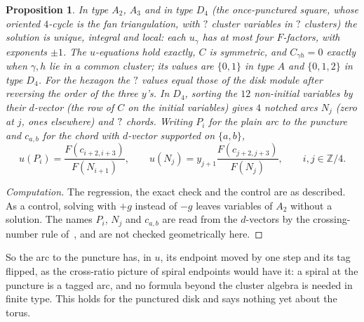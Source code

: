 \documentclass[11pt,a4paper]{article}
\newcommand{\SSSfUHexVars}{?}\newcommand{\SSSfUDVars}{?}\newcommand{\SSSfUDClusters}{?}
\newcommand{\ZZ}{\mathbb{Z}}
\theoremstyle{plain}
\newtheorem{proposition}{Proposition}
\theoremstyle{definition}
\begin{document}
\begin{proposition}
\label{prop:surf-u}
In type $A_2$, $A_3$ and in type $D_4$ (the once-punctured square, whose oriented $4$-cycle is the fan triangulation, with $\SSSfUDVars$ cluster variables in $\SSSfUDClusters$ clusters)
the solution is unique, integral and local: each $u_\gamma$ has at most four $F$-factors, with exponents $\pm1$. The $u$-equations hold exactly, $C$ is symmetric, and $C_{\gamma h}=0$ exactly when
$\gamma,h$ lie in a common cluster; its values are $\{0,1\}$ in type $A$ and $\{0,1,2\}$ in type $D_4$. For the hexagon the $\SSSfUHexVars$ values equal those of the disk module
after reversing the order of the three $y$'s. In $D_4$, sorting the $12$ non-initial variables by their $d$-vector (the row of $C$ on the initial variables) gives $4$ notched arcs $N_j$
(zero at $j$, ones elsewhere) and $?$ chords. Writing $P_i$ for the plain arc to the puncture and $c_{a,b}$ for the chord with $d$-vector supported on $\{a,b\}$,
\begin{equation}
  u(P_i)=\frac{F(c_{i+2,i+3})}{F(N_{i+1})},\qquad u(N_j)=y_{j+1}\frac{F(c_{j+2,j+3})}{F(N_j)},\qquad i,j\in\ZZ/4 .
  \label{eq:D4-u}
\end{equation}
\end{proposition}

\begin{proof}[Computation]
The regression, the exact check and the control are as described. As a control, solving with $+g$ instead of $-g$ leaves variables of $A_2$ without a solution. The names $P_i$, $N_j$ and $c_{a,b}$
are read from the $d$-vectors by the crossing-number rule of~\cite{FST}, and are not checked geometrically here.
\end{proof}

So the arc to the puncture has, in $u$, its endpoint moved by one step and its tag flipped, as the cross-ratio picture of spiral endpoints would have it: a spiral at the puncture is a tagged arc, and no formula beyond the cluster algebra is needed in
finite type.
This holds for the punctured disk and says nothing yet about the torus.
\end{document}
